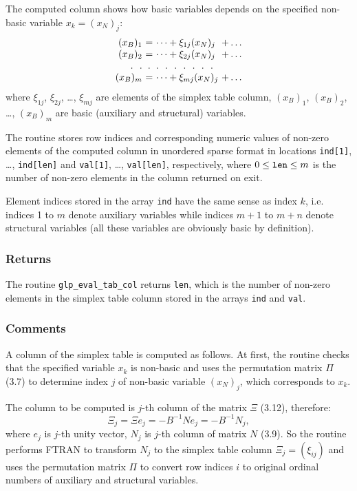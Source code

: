 The computed column shows how basic variables depends on the specified
non-basic variable $x_k=(x_N)_j$:
$$
\begin{array}{r@{\ }c@{\ }l@{\ }l}
(x_B)_1&=&\dots+\xi_{1j}(x_N)_j&+\dots\\
(x_B)_2&=&\dots+\xi_{2j}(x_N)_j&+\dots\\
.\ \ .&.&.\ \ .\ \ .\ \ .\ \ .\ \ .\ \ .\\
(x_B)_m&=&\dots+\xi_{mj}(x_N)_j&+\dots\\
\end{array}
$$
where $\xi_{1j}$, $\xi_{2j}$, \dots, $\xi_{mj}$ are elements of the
simplex table column, $(x_B)_1$, $(x_B)_2$, \dots, $(x_B)_m$ are basic
(auxiliary and structural) variables.

The routine stores row indices and corresponding numeric values of
non-zero elements of the computed column in unordered sparse format in
locations \verb|ind[1]|, \dots, \verb|ind[len]| and \verb|val[1]|,
\dots, \verb|val[len]|, respectively, where $0\leq{\tt len}\leq m$ is
the number of non-zero elements in the column returned on exit.

Element indices stored in the array \verb|ind| have the same sense as
index $k$, i.e. indices 1 to $m$ denote auxiliary variables while
indices $m+1$ to $m+n$ denote structural variables (all these variables
are obviously basic by definition).

\subsubsection*{Returns}

The routine \verb|glp_eval_tab_col| returns \verb|len|, which is the
number of non-zero elements in the simplex table column stored in the
arrays \verb|ind| and \verb|val|.

\subsubsection*{Comments}

A column of the simplex table is computed as follows. At first, the
routine checks that the specified variable $x_k$ is non-basic and uses
the permutation matrix $\Pi$ (3.7) to determine index $j$ of non-basic
variable $(x_N)_j$, which corresponds to $x_k$.

The column to be computed is $j$-th column of the matrix $\Xi$ (3.12),
therefore:
$$\Xi_j=\Xi e_j=-B^{-1}Ne_j=-B^{-1}N_j,$$
where $e_j$ is $j$-th unity vector, $N_j$ is $j$-th column of matrix
$N$ (3.9). So the routine performs FTRAN to transform $N_j$ to the
simplex table column $\Xi_j=(\xi_{ij})$ and uses the permutation matrix
$\Pi$ to convert row indices $i$ to original ordinal numbers of
auxiliary and structural variables.

